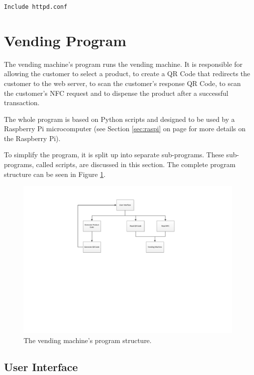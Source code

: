 \begin{verbatim}
Include httpd.conf
\end{verbatim}

\section{Vending Program}

The vending machine's program runs the vending machine. It is responsible for
allowing the customer to select a product, to create a QR Code that redirects
the customer to the web server, to scan the customer's response QR Code, to
scan the customer's NFC request and to dispense the product after a successful
transaction.

The whole program is based on Python scripts and
designed to be used by a Raspberry Pi microcomputer (see Section
\ref{sec:raspi} on page \pageref{sec:raspi} for more details on the Raspberry Pi).

To simplify the program, it is split up into separate sub-programs. These
sub-programs, called scripts, are discussed in this section. The complete
program structure can be seen in Figure \ref{fig:vm_prog_strcture}.

\begin{figure}
 \centering 
 \includegraphics[clip=true, trim = 100 320 0 50,
 scale=0.7]{vending_machine_program_structure}
 \caption{The vending machine's program structure.}
 \label{fig:vm_prog_strcture}
\end{figure}

\subsection{User Interface}

